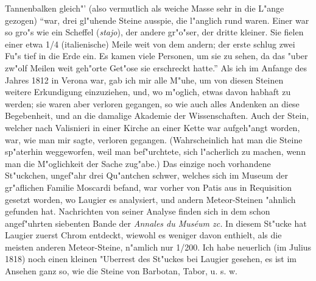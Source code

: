 \documentclass[a4paper, 11pt, oneside, polutonikogreek, german]{article}
\begin{document}
Tannenbalken gleich"' (also vermutlich als weiche Masse sehr in die L"ange gezogen) "`war, drei gl"uhende Steine ausspie, die l"anglich rund waren. Einer war so gro"s wie ein Scheffel (\emph{stajo}), der andere gr"o"ser, der dritte kleiner. Sie fielen einer etwa 1/4 (italienische) Meile weit von dem andern; der erste schlug zwei Fu"s tief in die Erde ein. Es kamen viele Personen, um sie zu sehen, da das "uber zw"olf Meilen weit geh"orte Get"ose sie erschreckt hatte."' Als ich im Anfange des Jahres 1812 in Verona war, gab ich mir alle M"uhe, um von diesen Steinen weitere Erkundigung einzuziehen, und, wo m"oglich, etwas davon habhaft zu werden; sie waren aber verloren gegangen, so wie auch alles Andenken an diese Begebenheit, und an die damalige Akademie der Wissenschaften. Auch der Stein, welcher nach Valisnieri in einer Kirche an einer Kette war aufgeh"angt worden, war, wie man mir sagte, verloren gegangen. (Wahrscheinlich hat man die Steine sp"aterhin weggeworfen, weil man bef"urchtete, sich l"acherlich zu machen, wenn man die M"oglichkeit der Sache zug"abe.) Das einzige noch vorhandene St"uckchen, ungef"ahr drei Qu"antchen schwer, welches sich im Museum der gr"aflichen Familie Moscardi befand, war vorher von Patis aus in Requisition gesetzt worden, wo Laugier es analysiert, und andern Meteor-Steinen "ahnlich gefunden hat. Nachrichten von seiner Analyse finden sich in dem schon angef"uhrten siebenten Bande der \emph{Annales du Muséum zc.} In diesem St"ucke hat Laugier zuerst Chrom entdeckt, wiewohl es weniger davon enthielt, als die meisten anderen Meteor-Steine, n"amlich nur 1/200. Ich habe neuerlich (im Julius 1818) noch einen kleinen "Uberrest des St"uckes bei Laugier gesehen, es ist im Ansehen ganz so, wie die Steine von Barbotan, Tabor, u. s. w.
\end{document}
